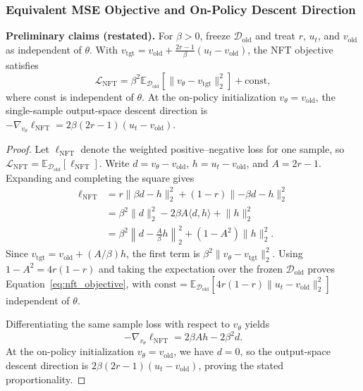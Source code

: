 \documentclass{article}
\begin{document}
\subsubsection{Equivalent MSE Objective and On-Policy Descent Direction}
\label{app:nft_mse_equivalence}
\noindent\textbf{Preliminary claims (restated).}
For $\beta>0$, freeze $\mathcal D_{\mathrm{old}}$ and treat $r$, $u_t$, and $v_{\mathrm{old}}$ as independent of $\theta$. With $v_{\mathrm{tgt}}=v_{\mathrm{old}}+\frac{2r-1}{\beta}(u_t-v_{\mathrm{old}})$, the NFT objective satisfies
\begin{equation*}
\mathcal L_{\mathrm{NFT}}=\beta^2\mathbb E_{\mathcal D_{\mathrm{old}}}\!\left[\lVert v_\theta-v_{\mathrm{tgt}}\rVert_2^2\right]+\mathrm{const},
\end{equation*}
where $\mathrm{const}$ is independent of $\theta$. At the on-policy initialization $v_\theta=v_{\mathrm{old}}$, the single-sample output-space descent direction is $-\nabla_{v_\theta}\ell_{\mathrm{NFT}}=2\beta(2r-1)(u_t-v_{\mathrm{old}})$.

\begin{proof}
Let $\ell_{\mathrm{NFT}}$ denote the weighted positive--negative loss for one sample, so $\mathcal L_{\mathrm{NFT}}=\mathbb E_{\mathcal D_{\mathrm{old}}}[\ell_{\mathrm{NFT}}]$. Write $d=v_\theta-v_{\mathrm{old}}$, $h=u_t-v_{\mathrm{old}}$, and $A=2r-1$. Expanding and completing the square gives
\begin{align*}
\ell_{\mathrm{NFT}}
&=r\lVert\beta d-h\rVert_2^2+(1-r)\lVert-\beta d-h\rVert_2^2\\
&=\beta^2\lVert d\rVert_2^2-2\beta A\langle d,h\rangle+\lVert h\rVert_2^2\\
&=\beta^2\left\lVert d-\frac{A}{\beta}h\right\rVert_2^2+(1-A^2)\lVert h\rVert_2^2.
\end{align*}
Since $v_{\mathrm{tgt}}=v_{\mathrm{old}}+(A/\beta)h$, the first term is $\beta^2\lVert v_\theta-v_{\mathrm{tgt}}\rVert_2^2$. Using $1-A^2=4r(1-r)$ and taking the expectation over the frozen $\mathcal D_{\mathrm{old}}$ proves Equation~\ref{eq:nft_objective}, with $\mathrm{const}=\mathbb E_{\mathcal D_{\mathrm{old}}}[4r(1-r)\lVert u_t-v_{\mathrm{old}}\rVert_2^2]$ independent of $\theta$.

Differentiating the same sample loss with respect to $v_\theta$ yields
\begin{equation*}
-\nabla_{v_\theta}\ell_{\mathrm{NFT}}=2\beta A h-2\beta^2d.
\end{equation*}
At the on-policy initialization $v_\theta=v_{\mathrm{old}}$, we have $d=0$, so the output-space descent direction is $2\beta(2r-1)(u_t-v_{\mathrm{old}})$, proving the stated proportionality.
\end{proof}
\end{document}
